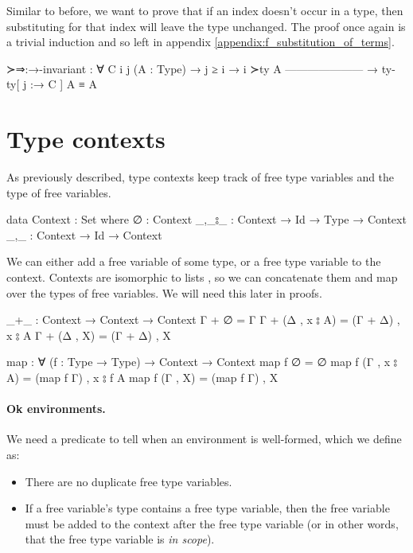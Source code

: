 \documentclass[logo,bsc,singlespacing,parskip,online]{infthesis}
\begin{document}
Similar to before, we want to prove that if an index doesn't occur in a type, then substituting for
that index will leave the type unchanged. The proof once again is a trivial induction and so left in appendix \ref{appendix:f_substitution_of_terms}.
\begin{code}
  ≻⇒:→-invariant : ∀ {C i j} (A : Type)
    → j ≥ i       → i ≻ty A
      ---------------------
    → ty-ty[ j :→ C ] A ≡ A
\end{code}

\section{Type contexts}
As previously described, type contexts keep track of free type variables and the type of free variables.
\begin{code}
  data Context : Set where
    ∅ : Context
    _,_⦂_ : Context → Id → Type → Context
    _,_ : Context → Id → Context
\end{code}

We can either add a free variable of some type, or a free type variable to the context. Contexts are
isomorphic to lists \citep{wadler_programming_2022}, so we can concatenate them and map over the
types of free variables. We will need this later in proofs.
\begin{code}
  _+_ : Context → Context → Context
  Γ + ∅ = Γ
  Γ + (Δ , x ⦂ A) = (Γ + Δ) , x ⦂ A
  Γ + (Δ , X) = (Γ + Δ) , X

  map : ∀ (f : Type → Type) → Context → Context
  map f ∅ = ∅
  map f (Γ , x ⦂ A) = (map f Γ) , x ⦂ f A
  map f (Γ , X) = (map f Γ) , X
\end{code}

\paragraph*{Ok environments.} We need a predicate to tell when an environment is well-formed, which we define as:
\begin{itemize}
  \item There are no duplicate free type variables.
  \item If a free variable's type contains a free type variable, then the free variable must be
  added to the context after the free type variable (or in other words, that the free type variable
  is \textit{in scope}).
\end{itemize}
\end{document}
